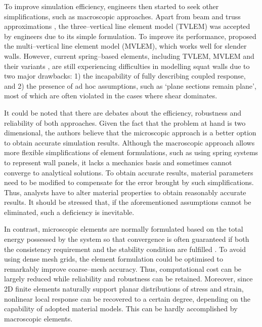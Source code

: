 \documentclass[3p,review,sort&compress,11pt,fleqn]{elsarticle}
\begin{document}
To improve simulation efficiency, engineers then started to seek other simplifications, such as macroscopic approaches. Apart from beam and truss approximations \citep[e.g.,][]{Hrennikoff1941}, the three--vertical line element model (TVLEM) \citep{Kabeyaswa1983} was accepted by engineers due to its simple formulation. To improve its performance, \citet{Colotti1993} proposed the multi--vertical line element model (MVLEM), which works well for slender walls. However, current spring--based elements, including TVLEM, MVLEM and their variants \citep[e.g.,][]{Massone2010,Fischinger2014,Kolozvari2015}, are still experiencing difficulties in modelling squat walls due to two major drawbacks: 1) the incapability of fully describing coupled response, and 2) the presence of ad hoc assumptions, such as `plane sections remain plane', most of which are often violated in the cases where shear dominates.

It could be noted that there are debates \cite{Orakcal2004,Palermo2007} about the efficiency, robustness and reliability of both approaches. Given the fact that the problem at hand is two dimensional, the authors believe that the microscopic approach is a better option to obtain accurate simulation results. Although the macroscopic approach allows more flexible simplifications of element formulations, such as using spring systems to represent wall panels, it lacks a mechanics basis and sometimes cannot converge to analytical solutions. To obtain accurate results, material parameters need to be modified to compensate for the error brought by such simplifications. Thus, analysts have to alter material properties to obtain reasonably accurate results. It should be stressed that, if the aforementioned assumptions cannot be eliminated, such a deficiency is inevitable.

In contrast, microscopic elements are normally formulated based on the total energy possessed by the system so that convergence is often guaranteed if both the consistency requirement and the stability condition are fulfilled \citep[see, e.g.,][]{Zienkiewicz2013,Ralston2001}. To avoid using dense mesh grids, the element formulation could be optimised to remarkably improve coarse--mesh accuracy. Thus, computational cost can be largely reduced while reliability and robustness can be retained. Moreover, since 2D finite elements naturally support planar distributions of stress and strain, nonlinear local response can be recovered to a certain degree, depending on the capability of adopted material models. This can be hardly accomplished by macroscopic elements.
\end{document}
